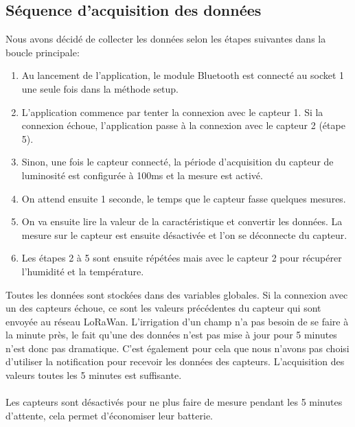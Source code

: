\subsection{Séquence d'acquisition des données}
Nous avons décidé de collecter les données selon les étapes suivantes dans la boucle principale:
\begin{enumerate}
\item Au lancement de l'application, le module Bluetooth est connecté au socket 1 une seule fois dans la méthode setup.
\item L'application commence par tenter la connexion avec le capteur 1. Si la connexion échoue, l'application passe à la connexion avec le capteur 2 (étape 5).
\item Sinon, une fois le capteur connecté, la période d'acquisition du capteur de luminosité est configurée à 100ms et la mesure est activé. 
\item On attend ensuite 1 seconde, le temps que le capteur fasse quelques mesures. 
\item On va ensuite lire la valeur de la caractéristique et convertir les données. La mesure sur le capteur est ensuite désactivée et l'on se déconnecte du capteur.
\item Les étapes 2 à 5 sont ensuite répétées mais avec le capteur 2 pour récupérer l'humidité et la température.
\end{enumerate}
Toutes les données sont stockées dans des variables globales. Si la connexion avec un des capteurs échoue, ce sont les valeurs précédentes du capteur qui sont envoyée au réseau LoRaWan. L'irrigation d'un champ n'a pas besoin de se faire à la minute près, le fait qu'une des données n'est pas mise à jour pour 5 minutes n'est donc pas dramatique. C'est également pour cela que nous n'avons pas choisi d'utiliser la notification pour recevoir les données des capteurs. L'acquisition des valeurs toutes les 5 minutes est suffisante.\\\\
Les capteurs sont désactivés pour ne plus faire de mesure pendant les 5 minutes d'attente, cela permet d'économiser leur batterie.
